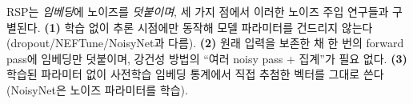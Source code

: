 RSP는 \textit{임베딩}에 노이즈를 \textit{덧붙이며}, 세 가지 점에서 이러한 노이즈 주입 연구들과 구별된다. \textbf{(1)} 학습 없이 추론 시점에만 동작해 모델 파라미터를 건드리지 않는다(dropout/NEFTune/NoisyNet과 다름). \textbf{(2)} 원래 입력을 보존한 채 한 번의 forward pass에 임베딩만 덧붙이며, 강건성 방법의 ``여러 noisy pass + 집계''가 필요 없다. \textbf{(3)} 학습된 파라미터 없이 사전학습 임베딩 통계에서 직접 추첨한 벡터를 그대로 쓴다(NoisyNet은 노이즈 파라미터를 학습).
